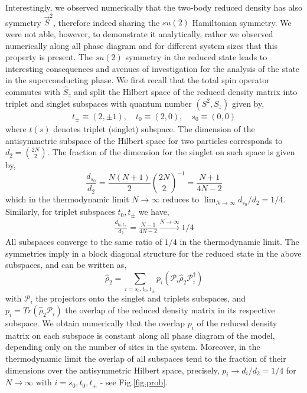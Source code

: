 \documentclass[prb,reprint,showpacs,twocolumn,superscriptaddress]{revtex4-2}
\begin{document}
 Interestingly, we observed numerically that the two-body reduced density has also symmetry $\vec{S}^2$, therefore indeed sharing the $su(2)$ Hamiltonian symmetry. We were not able, however, to demonstrate it analytically, rather we observed numerically along all phase diagram and for different system sizes that this property is present. 
 The $su(2)$ symmetry in the reduced state leads to interesting consequences and avenues of investigation for the analysis of the state in the superconducting phase.
 We first recall that the total spin operator commutes with $\hat S_z$ and split the Hilbert space of the reduced density matrix into triplet and singlet subspaces with quantum number $(S^2,S_z)$ given by,
 \begin{eqnarray}
  t_\pm \equiv (2,\pm 1), \quad t_0 \equiv (2,0),\quad s_0 \equiv (0,0)
 \end{eqnarray}
where $t (s)$ denotes triplet (singlet) subspace. The dimension of the antisymmetric subspace of the  Hilbert space for two particles corresponds to $d_2 = \binom{2N}{2}$. The fraction of the dimension for the singlet on such space is given by,
\begin{equation}
  \frac{d_{s_0}}{d_2}= \frac{N(N+1)}{2}\binom{2N}{2}^{-1} 
  = \frac{N+1}{4N-2}
 \end{equation}
 which in the thermodynamic limit $N\rightarrow\infty$ reduces to $
 \lim_{N\to\infty}  d_{s_0} /d_2 = 1/4$. 
Similarly, for triplet subspaces $t_0,t_\pm$ we have,
\begin{eqnarray}
  \frac{ d_{t_0,t_\pm} }{d_2} =\frac{N-1}{4N-2} \overset{N\rightarrow \infty }{\longrightarrow } 1/4
 \end{eqnarray}
 All subspaces converge to the same ratio of $1/4$ in the thermodynamic limit. The symmetries imply in a block diagonal structure for the reduced state in the above subspaces, and can be written as,
 \begin{equation}
  \hat \rho_2 = \sum_{i = s_0,t_0,t_{\pm}} p_i ( \mathcal{P}_i \hat \rho_2 \mathcal{P}_i^\dagger)
 \end{equation}
 with $\mathcal{P}_i$ the projectors onto the singlet and triplets subspaces, and $p_i = Tr(\hat \rho_2 \mathcal{P}_i)$ the overlap of the reduced density matrix in its respective subspace.
We obtain numerically that the overlap $p_i$ of the reduced density matrix on each subspace is constant along all phase diagram of the model, depending only on the number of sites in the system. Moreover, in the thermodynamic limit the overlap of all subspaces tend to the fraction of their dimensions over the antisymmetric Hilbert space, precisely, $p_i \rightarrow d_{i}/d_2=1/4$ for 
$N \rightarrow \infty$ with $i = s_0,t_0,t_{\pm}$ - see Fig.\ref{fig.prob}. 
\end{document}
